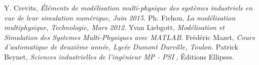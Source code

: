 \begin{thebibliography}{2}
    Y. Crevits, {\it Éléments de modélisation multi-physique des systèmes industriels en vue de leur simulation numérique, Juin 2015.}
    Ph. Fichou, {\it La modélisation multiphysique, Technologie, Mars 2012.}
    Yvan Liebgott, {\it Modélisation et Simulation des Systemes Multi-Physiques avec MATLAB.}
    Frédéric Mazet, {\it Cours d'automatique de deuxième année, Lycée Dumont Durville, Toulon.}
    Patrick Beynet, {\it Sciences industrielles de l'ingénieur MP - PSI}
, Éditions Ellipses.

\end{thebibliography}

